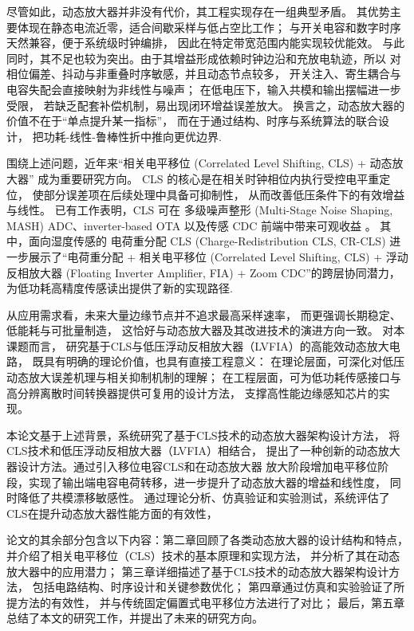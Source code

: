 尽管如此，动态放大器并非没有代价，其工程实现存在一组典型矛盾。
其优势主要体现在静态电流近零，适合间歇采样与低占空比工作；
与开关电容和数字时序天然兼容，便于系统级时钟编排，
因此在特定带宽范围内能实现较优能效。
与此同时，其不足也较为突出。由于其增益形成依赖时钟边沿和充放电轨迹，所以
对相位偏差、抖动与非重叠时序敏感，并且动态节点较多，
开关注入、寄生耦合与电容失配会直接映射为非线性与噪声；
在低电压下，输入共模和输出摆幅进一步受限，
若缺乏配套补偿机制，易出现闭环增益误差放大。
换言之，动态放大器的价值不在于“单点提升某一指标”，
而在于通过结构、时序与系统算法的联合设计，
把功耗-线性-鲁棒性折中推向更优边界\cite{tang2020ns_sar,tang2020zoomcdc}.

围绕上述问题，近年来“相关电平移位 (Correlated Level Shifting, CLS) + 动态放大器”
成为重要研究方向。
CLS 的核心是在相关时钟相位内执行受控电平重定位，
使部分误差项在后续处理中具备可抑制性，
从而改善低压条件下的有效增益与线性。
已有工作表明，CLS 可在 多级噪声整形 (Multi-Stage Noise Shaping, MASH) ADC、inverter-based OTA
以及传感 CDC 前端中带来可观收益
\cite{hu2022mashcls,meng2023jssc_mash,liu2020pingpongcls,li2024crcls}。
其中，面向湿度传感的 电荷重分配 CLS (Charge-Redistribution CLS, CR-CLS)
进一步展示了“电荷重分配 + 相关电平移位 (Correlated Level Shifting, CLS) + 浮动反相放大器 (Floating Inverter Amplifier, FIA) + Zoom CDC”的跨层协同潜力，
为低功耗高精度传感读出提供了新的实现路径\cite{li2024crcls}.

从应用需求看，未来大量边缘节点并不追求最高采样速率，
而更强调长期稳定、低能耗与可批量制造，
这恰好与动态放大器及其改进技术的演进方向一致。
对本课题而言，
研究基于CLS与低压浮动反相放大器（LVFIA）的高能效动态放大电路，
既具有明确的理论价值，也具有直接工程意义：
在理论层面，可深化对低压动态放大误差机理与相关抑制机制的理解；
在工程层面，可为低功耗传感接口与高分辨离散时间转换器提供可复用的设计方法，
支撑高性能边缘感知芯片的实现。

本论文基于上述背景，系统研究了基于CLS技术的动态放大器架构设计方法，
将CLS技术和低压浮动反相放大器（LVFIA）相结合，
提出了一种创新的动态放大器设计方法。通过引入移位电容CLS和在动态放大器
放大阶段增加电平移位阶段，实现了输出端电容电荷转移，进一步提升了动态放大器的增益和线性度，
同时降低了共模漂移敏感性。
通过理论分析、仿真验证和实验测试，系统评估了CLS在提升动态放大器性能方面的有效性，

论文的其余部分包含以下内容：第二章回顾了各类动态放大器的设计结构和特点，
并介绍了相关电平移位（CLS）技术的基本原理和实现方法，
并分析了其在动态放大器中的应用潜力；
第三章详细描述了基于CLS技术的动态放大器架构设计方法，
包括电路结构、时序设计和关键参数优化；
第四章通过仿真和实验验证了所提方法的有效性，
并与传统固定偏置式电平移位方法进行了对比；
最后，第五章总结了本文的研究工作，并提出了未来的研究方向。